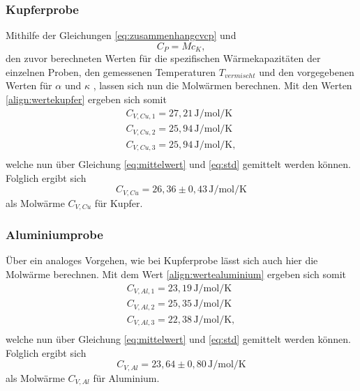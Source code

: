 \subsubsection{Kupferprobe}
Mithilfe der Gleichungen \ref{eq:zusammenhangcvcp} und
\begin{equation}
    C_{P} = M c_K,
\end{equation}
\noindent
den zuvor berechneten Werten für die spezifischen
Wärmekapazitäten der einzelnen Proben, den gemessenen Temperaturen $T_{vermischt}$ und den 
vorgegebenen Werten für $\alpha$ und $\kappa$ \cite{sample}, 
lassen sich nun die Molwärmen berechnen. Mit den Werten
\ref{align:wertekupfer} ergeben sich somit 
\begin{align}
    C_{V,Cu,1} = 27,21\, \si{\joule\per\mole\per\kelvin} \nonumber \\
    C_{V,Cu,2} = 25,94\, \si{\joule\per\mole\per\kelvin} \nonumber \\
    C_{V,Cu,3} = 25,94\, \si{\joule\per\mole\per\kelvin}, \\
    \label{align:wertekupfer}
\end{align}
\noindent 
welche nun über Gleichung \ref{eq:mittelwert} und \ref{eq:std} gemittelt werden können. Folglich ergibt sich
\begin{equation}
    C_{V,Cu} = 26,36 \pm 0,43\, \si{\joule\per\mole\per\kelvin}
\end{equation}
als Molwärme $C_{V,Cu}$ für Kupfer.




\subsubsection{Aluminiumprobe}
Über ein analoges Vorgehen, wie bei Kupferprobe lässt sich auch hier die Molwärme 
berechnen. Mit dem Wert \ref{align:wertealuminium} ergeben sich somit 
\begin{align}
    C_{V,Al,1} = 23,19\, \si{\joule\per\mole\per\kelvin} \nonumber \\
    C_{V,Al,2} = 25,35\, \si{\joule\per\mole\per\kelvin} \nonumber \\
    C_{V,Al,3} = 22,38\, \si{\joule\per\mole\per\kelvin}, \\
    \label{align:wertealuminium}
\end{align}
\noindent 
welche nun über Gleichung \ref{eq:mittelwert} und \ref{eq:std} gemittelt werden können. Folglich ergibt sich
\begin{equation}
    C_{V,Al} = 23,64 \pm 0,80\, \si{\joule\per\mole\per\kelvin}
\end{equation}
als Molwärme $C_{V,Al}$ für Aluminium.





